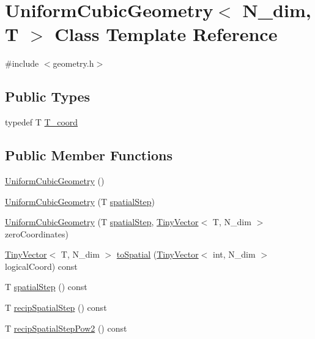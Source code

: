 \hypertarget{classUniformCubicGeometry}{}\section{Uniform\+Cubic\+Geometry$<$ N\+\_\+dim, T $>$ Class Template Reference}
\label{classUniformCubicGeometry}


{\ttfamily \#include $<$geometry.\+h$>$}

\subsection*{Public Types}
\begin{DoxyCompactItemize}
\item 
typedef T \hyperlink{classUniformCubicGeometry_a0ef9895549a31693f6a02bb5ffd74f74}{T\+\_\+coord}
\end{DoxyCompactItemize}
\subsection*{Public Member Functions}
\begin{DoxyCompactItemize}
\item 
\hyperlink{classUniformCubicGeometry_a10a62aa7a4fabeee0ddcc560d975f9e4}{Uniform\+Cubic\+Geometry} ()
\item 
\hyperlink{classUniformCubicGeometry_a5e005a009b018693eca62eea938cf588}{Uniform\+Cubic\+Geometry} (T \hyperlink{classUniformCubicGeometry_a1775c1c6b546e2f70279d6af406a85d7}{spatial\+Step})
\item 
\hyperlink{classUniformCubicGeometry_a5897dda903af0267732db110d7b21aee}{Uniform\+Cubic\+Geometry} (T \hyperlink{classUniformCubicGeometry_a1775c1c6b546e2f70279d6af406a85d7}{spatial\+Step}, \hyperlink{classTinyVector}{Tiny\+Vector}$<$ T, N\+\_\+dim $>$ zero\+Coordinates)
\item 
\hyperlink{classTinyVector}{Tiny\+Vector}$<$ T, N\+\_\+dim $>$ \hyperlink{classUniformCubicGeometry_af40fbad7e4fa1d86c51487f6d7a4b0cc}{to\+Spatial} (\hyperlink{classTinyVector}{Tiny\+Vector}$<$ int, N\+\_\+dim $>$ logical\+Coord) const 
\item 
T \hyperlink{classUniformCubicGeometry_a1775c1c6b546e2f70279d6af406a85d7}{spatial\+Step} () const 
\item 
T \hyperlink{classUniformCubicGeometry_a414c2cacc4f8db1dcd3b67c5228a83e7}{recip\+Spatial\+Step} () const 
\item 
T \hyperlink{classUniformCubicGeometry_a9eb00713c39db99a7996a5a56a7afdfe}{recip\+Spatial\+Step\+Pow2} () const 
\end{DoxyCompactItemize}


